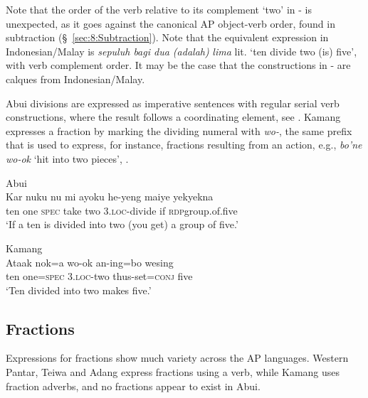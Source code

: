  

  

Note that the order of the verb relative to its complement `two' in - is unexpected, as it goes against the canonical AP object-verb order, found in subtraction ({\S}~\ref{sec:8:Subtraction}). Note that the equivalent expression in Indonesian/Malay is \textit{sepuluh bagi dua (adalah)} \textit{lima} lit. `ten divide two (is) five', with verb complement order. It may be the case that the constructions in - are calques from Indonesian/Malay. 

Abui divisions are expressed as imperative sentences with regular serial verb constructions, where the result follows a coordinating element, see . Kamang expresses a fraction by marking the dividing numeral with \textit{wo-}, the same prefix that is used to express, for instance, fractions resulting from an action, e.g., \textit{bo'ne wo-ok} `hit into two pieces', . 


\ea%
\label{bkm:Ref358116296}
{\upshape Abui}\\
\gll  Kar  nuku  nu  mi  ayoku  he-yeng  maiye  yek{\Tilde}yekna \\  
    ten  one  \textsc{spec}  take  two  3.\textsc{loc-}divide  if  \textsc{rdp}{\Tilde}group.of.five \\
\glt  `If a ten is divided into two (you get) a group of five.'
\z



 




\ea
\label{ex:8:1247}
{\upshape Kamang}\\
 \gll Ataak  nok=a  wo-ok  an-ing=bo  wesing \\
  ten  one=\textsc{spec}  \textsc{3.loc}-two  thus-set=\textsc{conj}  five \\
 \glt`Ten divided into two makes five.'
\z


\subsection{Fractions}
\label{sec:8:Fractions}
Expressions for fractions show much variety across the AP languages. Western Pantar, Teiwa and Adang express fractions using a verb, while Kamang uses fraction adverbs, and no fractions appear to exist in Abui. 

